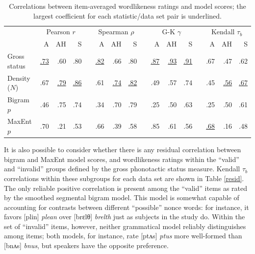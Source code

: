 \begin{table}
\centering
\begin{tabular}{l rrr c rrr c rrr c rrr}
\toprule
              &         \multicolumn{3}{c}{Pearson $r$} &&     \multicolumn{3}{c}{Spearman $\rho$} && \multicolumn{3}{c}{G-K $\gamma$} && \multicolumn{3}{c}{Kendall $\tau_b$} \\
\cmidrule{2-4} \cmidrule{6-8} \cmidrule{10-12} \cmidrule{14-16}
              &           A &         AH &            S &&           A &       AH    &           S &&           A &          AH &           S &&           A &          AH & S \\
\midrule
Gross status & \uline{.73} &       {.60} &       {.80} && \uline{.82} &       {.66} &       {.80} && \uline{.87} & \uline{.93} & \uline{.91} &&       {.67} &       {.47} &       {.62} \\
Density ($N$) &       {.67} & \uline{.79} & \uline{.86} &&       {.61} & \uline{.74} & \uline{.82} &&       {.49} &       {.57} &       {.74} &&       {.45} & \uline{.56} & \uline{.67} \\
Bigram $p$ &       {.46} &       {.75} &       {.74} &&       {.34} &       {.70} &       {.79} &&       {.25} &       {.50} &       {.63} &&       {.25} &       {.50} &       {.61} \\
MaxEnt $p$ &       {.70} &       {.21} &       {.53} &&       {.66} &       {.39} &       {.58} &&       {.85} &       {.61} &       {.56} && \uline{.68} &       {.16} &       {.48} \\ 
\bottomrule
\end{tabular}
\caption{Correlations between item-averaged wordlikeness ratings and model scores; the largest coefficient for each statistic/data set pair is underlined.}
\label{scores}
\end{table}

It is also possible to consider whether there is any residual correlation between bigram and MaxEnt model scores, and wordlikeness ratings within the ``valid'' and ``invalid'' groups defined by the gross phonotactic status measure. Kendall $\tau_{b}$ correlations within these subgroups for each data set are shown in Table \ref{resid}. The only reliable positive correlation is present among the ``valid'' items as rated by the smoothed segmental bigram model. This model is somewhat capable of accounting for contrasts between different ``possible'' nonce words: for instance, it favors [plin] \emph{plean} over [brɛlθ] \emph{brelth} just as subjects in the \citet{Albright2007} study do. Within the set of ``invalid'' items, however, neither grammatical model reliably distinguishes among items; both models, for instance, rate [ptʌs] \emph{ptus} more well-formed than [bnʌs] \emph{bnus}, but speakers have the opposite preference. 

